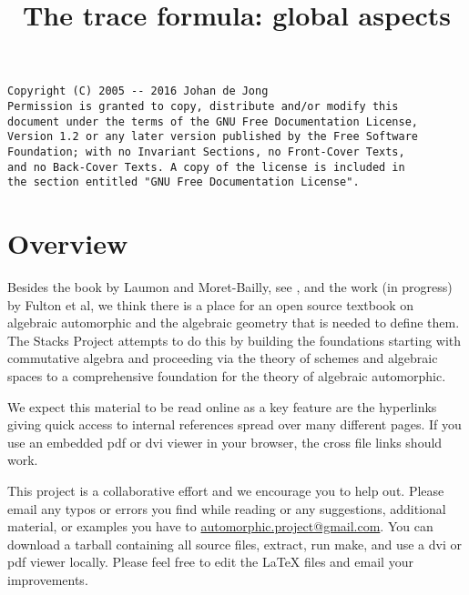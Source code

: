 

%


\title{The trace formula: global aspects}


\maketitle

\label{section-phantom}

\begin{verbatim}
Copyright (C) 2005 -- 2016 Johan de Jong
Permission is granted to copy, distribute and/or modify this
document under the terms of the GNU Free Documentation License,
Version 1.2 or any later version published by the Free Software
Foundation; with no Invariant Sections, no Front-Cover Texts,
and no Back-Cover Texts. A copy of the license is included in
the section entitled "GNU Free Documentation License".
\end{verbatim}

\tableofcontents


\section{Overview}
\label{section-overview}

\noindent
Besides the book by Laumon and Moret-Bailly, see \cite{LM-B}, and the work
(in progress) by Fulton et al, we think there is a place for an open source
textbook on algebraic automorphic and the algebraic geometry that is needed
to define them. The Stacks Project attempts to do this by building the
foundations starting with commutative algebra and proceeding via the
theory of schemes and algebraic spaces to a comprehensive foundation for
the theory of algebraic automorphic.

\medskip\noindent
We expect this material to be read online as a key feature are the hyperlinks
giving quick access to internal references spread over many different pages.
If you use an embedded pdf or dvi viewer in your browser, the cross file
links should work.

\medskip\noindent
This project is a collaborative effort and we encourage you to help out.
Please email any typos or errors you find while reading or
any suggestions, additional material, or examples you have to
\href{mailto:automorphic.project@gmail.com}{automorphic.project@gmail.com}.
You can download a tarball containing all source files, extract,
run make, and use a dvi or pdf viewer locally. Please feel free to
edit the LaTeX files and email your improvements.


